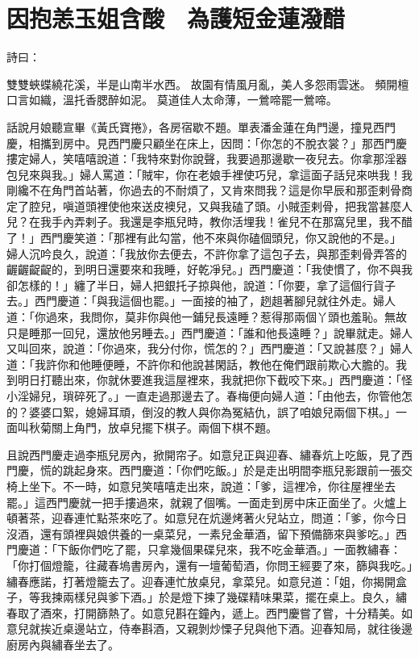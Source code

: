 %

\chapter{因抱恙玉姐含酸　為護短金蓮潑醋}

詩曰：

雙雙蛺蝶繞花溪，半是山南半水西。
故園有情風月亂，美人多怨雨雲迷。
頻開檀口言如織，溫托香腮醉如泥。
莫道佳人太命薄，一鶯啼罷一鶯啼。

話說月娘聽宣畢《黃氏寶捲》，各房宿歇不題。單表潘金蓮在角門邊，撞見西門慶，相攜到房中。見西門慶只顧坐在床上，因問：「你怎的不脫衣裳？」那西門慶摟定婦人，笑嘻嘻說道：「我特來對你說聲，我要過那邊歇一夜兒去。你拿那淫器包兒來與我。」婦人罵道：「賊牢，你在老娘手裡使巧兒，拿這面子話兒來哄我！我剛纔不在角門首站著，你過去的不耐煩了，又肯來問我？這是你早辰和那歪剌骨商定了腔兒，嗔道頭裡使他來送皮襖兒，又與我磕了頭。小賊歪剌骨，把我當甚麼人兒？在我手內弄剌子。我還是李瓶兒時，教你活埋我！雀兒不在那窩兒里，我不醋了！」西門慶笑道：「那裡有此勾當，他不來與你磕個頭兒，你又說他的不是。」 婦人沉吟良久，說道：「我放你去便去，不許你拿了這包子去，與那歪剌骨弄答的齷齷齪齪的，到明日還要來和我睡，好乾凈兒。」西門慶道：「我使慣了，你不與我卻怎樣的！」纏了半日，婦人把銀托子掠與他，說道：「你要，拿了這個行貨子去。」西門慶道：「與我這個也罷。」一面接的袖了，趔趄著腳兒就往外走。婦人道：「你過來，我問你，莫非你與他一鋪兒長遠睡？惹得那兩個丫頭也羞恥。無故只是睡那一回兒，還放他另睡去。」西門慶道：「誰和他長遠睡？」說畢就走。婦人又叫回來，說道：「你過來，我分付你，慌怎的？」西門慶道：「又說甚麼？」婦人道：「我許你和他睡便睡，不許你和他說甚閑話，教他在俺們跟前欺心大膽的。我到明日打聽出來，你就休要進我這屋裡來，我就把你下截咬下來。」西門慶道：「怪小淫婦兒，瑣碎死了。」一直走過那邊去了。春梅便向婦人道：「由他去，你管他怎的？婆婆口絮，媳婦耳頑，倒沒的教人與你為冤結仇，誤了咱娘兒兩個下棋。」一面叫秋菊關上角門，放卓兒擺下棋子。兩個下棋不題。

且說西門慶走過李瓶兒房內，掀開帘子。如意兒正與迎春、繡春炕上吃飯，見了西門慶，慌的跳起身來。西門慶道：「你們吃飯。」於是走出明間李瓶兒影跟前一張交椅上坐下。不一時，如意兒笑嘻嘻走出來，說道：「爹，這裡冷，你往屋裡坐去罷。」這西門慶就一把手摟過來，就親了個嘴。一面走到房中床正面坐了。火爐上頓著茶，迎春連忙點茶來吃了。如意兒在炕邊烤著火兒站立，問道：「爹，你今日沒酒，還有頭裡與娘供養的一桌菜兒，一素兒金華酒，留下預備篩來與爹吃。」西門慶道：「下飯你們吃了罷，只拿幾個果碟兒來，我不吃金華酒。」一面教繡春：「你打個燈籠，往藏春塢書房內，還有一壇葡萄酒，你問王經要了來，篩與我吃。」繡春應諾，打著燈籠去了。迎春連忙放桌兒，拿菜兒。如意兒道：「姐，你揭開盒子，等我揀兩樣兒與爹下酒。」於是燈下揀了幾碟精味果菜，擺在桌上。良久，繡春取了酒來，打開篩熱了。如意兒斟在鐘內，遞上。西門慶嘗了嘗，十分精美。如意兒就挨近桌邊站立，侍奉斟酒，又親剝炒慄子兒與他下酒。迎春知局，就往後邊廚房內與繡春坐去了。

